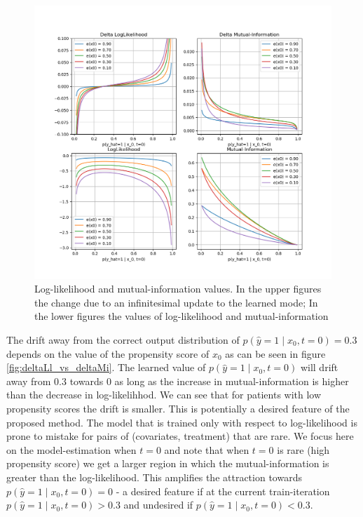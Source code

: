 \documentclass[oneside,12pt]{article}
\begin{document}
\begin{figure}
    \centering
        \includegraphics[width=1.0\textwidth]{./LL_MI}
        \caption{\label{fig:LL_MI}Log-likelihood and mutual-information values. In the upper figures the change due to an infinitesimal update to the learned mode; In the lower figures the values of log-likelihood and mutual-information}
\end{figure}
%
The drift away from the correct output distribution of $p(\hat{y} = 1 \mid x_0, t=0)=0.3$ depends on the value of the propensity score of $x_0$ as can be seen in figure \ref{fig:deltaLl_vs_deltaMi}. The learned value of $p(\hat{y} = 1 \mid x_0, t=0)$ will drift away from $0.3$ towards $0$ as long as the increase in mutual-information is higher than the decrease in log-likelihhod. We can see that for patients with low propensity scores the drift is smaller. This is potentially a desired feature of the proposed method. The model that is trained only with respect to log-likelihood is prone to mistake for pairs of (covariates, treatment) that are rare. We focus here on the model-estimation when $t=0$ and note that when $t=0$ is rare (high propensity score) we get a larger region in which the mutual-information is greater than the log-likelihood. This amplifies the attraction towards $p(\hat{y} = 1 \mid x_0, t=0) = 0$ - a desired feature if at the current train-iteration $p(\hat{y} = 1 \mid x_0, t=0) > 0.3$ and undesired if $p(\hat{y} = 1 \mid x_0, t=0) < 0.3$.\\\\
\end{document}
